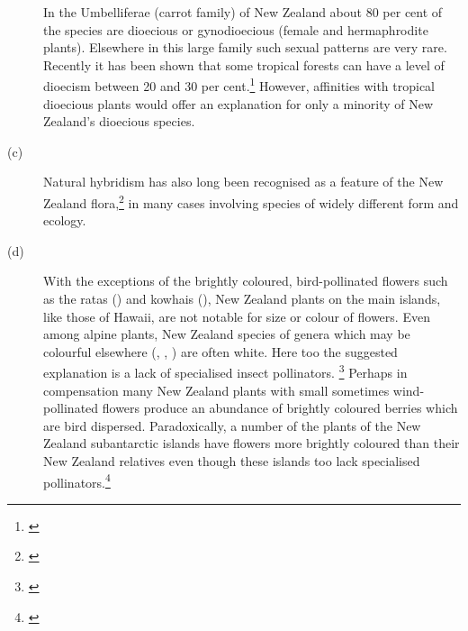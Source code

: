 \begin{description}
In the Umbelliferae (carrot family) of New Zealand about 80 per cent of the species are dioecious or gynodioecious (female and hermaphrodite plants).
Elsewhere in this large family such sexual patterns are very rare.
Recently it has been shown that some tropical forests can have a level of dioecism between 20 and 30 per cent.\footnote{\cite{bawa1979breeding}}
However, affinities with tropical dioecious plants would offer an explanation for only a minority of New Zealand's dioecious species.
\item[{(c)}]Natural hybridism has also long been recognised as a feature of  the New Zealand flora,\footnote{\cite{connor1985biosystematics}} in many cases involving species of widely different form and ecology.
\item[{(d)}]With the exceptions of the brightly coloured, bird-pollinated flowers such as the ratas () and kowhais (), New Zealand plants on the main islands, like those of Hawai{\okina}i, are not notable for size or colour of flowers.
Even among alpine plants, New Zealand species of genera which may be colourful elsewhere (, , ) are often white.
Here too the suggested explanation is a lack of specialised insect pollinators. \footnote{\cite{primack1983insect}} Perhaps in compensation many New Zealand plants with small sometimes wind-pollinated flowers produce an abundance of brightly coloured berries which are bird dispersed.
Paradoxically, a number of the plants of the New Zealand subantarctic islands have flowers more brightly coloured than their New Zealand relatives even though these islands too lack specialised pollinators.\footnote{\cite{godley1979flower}}
\end{description}

